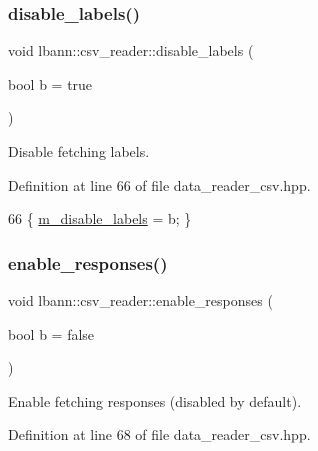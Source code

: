 \subsubsection{\texorpdfstring{disable\+\_\+labels()}{disable\_labels()}}
{\footnotesize\ttfamily void lbann\+::csv\+\_\+reader\+::disable\+\_\+labels (\begin{DoxyParamCaption}\item[{bool}]{b = {\ttfamily true} }\end{DoxyParamCaption})\hspace{0.3cm}{\ttfamily [inline]}}



Disable fetching labels. 



Definition at line 66 of file data\+\_\+reader\+\_\+csv.\+hpp.


\begin{DoxyCode}
66 \{ \hyperlink{classlbann_1_1csv__reader_a5f013485fc1466dcf1f78ef020b845d4}{m\_disable\_labels} = b; \}
\end{DoxyCode}
\mbox{\label{classlbann_1_1csv__reader_a7f2f980b860939e561d669575da9fb49}} 
\subsubsection{\texorpdfstring{enable\+\_\+responses()}{enable\_responses()}}
{\footnotesize\ttfamily void lbann\+::csv\+\_\+reader\+::enable\+\_\+responses (\begin{DoxyParamCaption}\item[{bool}]{b = {\ttfamily false} }\end{DoxyParamCaption})\hspace{0.3cm}{\ttfamily [inline]}}



Enable fetching responses (disabled by default). 



Definition at line 68 of file data\+\_\+reader\+\_\+csv.\+hpp.


